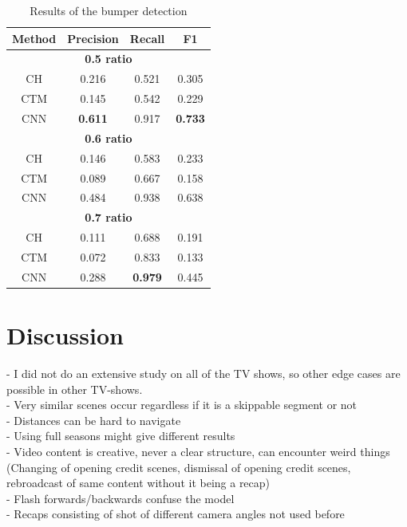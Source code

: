 \documentclass{article}
\begin{document}
\begin{table}[h!]
	\centering
	\begin{tabular}{ c c c c } 
		\hline
		\textbf{Method} & \textbf{Precision} & \textbf{Recall} & \textbf{F1} \\
		\hline
		\hline
		\multicolumn{4}{c}{\textbf{0.5 ratio}} \\
		\hline
		CH 	& 0.216		& 0.521		& 0.305 \\ 
		CTM & 0.145		& 0.542		& 0.229 \\ 
		CNN & \textbf{0.611}		& 0.917		& \textbf{0.733} \\
		\hline
		\multicolumn{4}{c}{\textbf{0.6 ratio}} \\
		\hline
		CH 	& 0.146		& 0.583		& 0.233 \\ 
		CTM & 0.089		& 0.667		& 0.158 \\ 
		CNN & 0.484		& 0.938		& 0.638 \\
		\hline
		\multicolumn{4}{c}{\textbf{0.7 ratio}} \\
		\hline
		CH 	& 0.111		& 0.688		& 0.191 \\ 
		CTM & 0.072		& 0.833		& 0.133 \\ 
		CNN & 0.288		& \textbf{0.979}		& 0.445 \\
		\hline
	\end{tabular}
	\caption{Results of the bumper detection}
\end{table}

\section{Discussion} \label{discussion}

- I did not do an extensive study on all of the TV shows, so other edge cases are possible in other TV-shows.\\
- Very similar scenes occur regardless if it is a skippable segment or not\\
- Distances can be hard to navigate\\
- Using full seasons might give different results\\
- Video content is creative, never a clear structure, can encounter weird things (Changing of opening credit scenes, dismissal of opening credit scenes, rebroadcast of same content without it being a recap)\\
- Flash forwards/backwards confuse the model\\
- Recaps consisting of shot of different camera angles not used before
\end{document}
